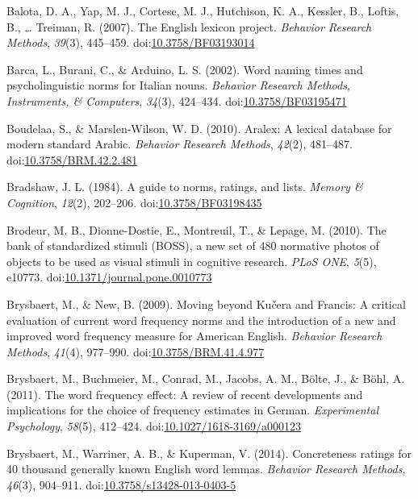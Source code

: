 \documentclass[english,man]{apa6}
\theoremstyle{definition}
\theoremstyle{definition}
\theoremstyle{definition}
\theoremstyle{remark}
\begin{document}
\hypertarget{ref-Balota2007}{}
Balota, D. A., Yap, M. J., Cortese, M. J., Hutchison, K. A., Kessler,
B., Loftis, B., \ldots{} Treiman, R. (2007). The English lexicon
project. \emph{Behavior Research Methods}, \emph{39}(3), 445--459.
doi:\href{https://doi.org/10.3758/BF03193014}{10.3758/BF03193014}

\hypertarget{ref-Barca2002}{}
Barca, L., Burani, C., \& Arduino, L. S. (2002). Word naming times and
psycholinguistic norms for Italian nouns. \emph{Behavior Research
Methods, Instruments, \& Computers}, \emph{34}(3), 424--434.
doi:\href{https://doi.org/10.3758/BF03195471}{10.3758/BF03195471}

\hypertarget{ref-Boudelaa2010}{}
Boudelaa, S., \& Marslen-Wilson, W. D. (2010). Aralex: A lexical
database for modern standard Arabic. \emph{Behavior Research Methods},
\emph{42}(2), 481--487.
doi:\href{https://doi.org/10.3758/BRM.42.2.481}{10.3758/BRM.42.2.481}

\hypertarget{ref-Bradshaw1984}{}
Bradshaw, J. L. (1984). A guide to norms, ratings, and lists.
\emph{Memory \& Cognition}, \emph{12}(2), 202--206.
doi:\href{https://doi.org/10.3758/BF03198435}{10.3758/BF03198435}

\hypertarget{ref-Brodeur2010}{}
Brodeur, M. B., Dionne-Dostie, E., Montreuil, T., \& Lepage, M. (2010).
The bank of standardized stimuli (BOSS), a new set of 480 normative
photos of objects to be used as visual stimuli in cognitive research.
\emph{PLoS ONE}, \emph{5}(5), e10773.
doi:\href{https://doi.org/10.1371/journal.pone.0010773}{10.1371/journal.pone.0010773}

\hypertarget{ref-Brysbaert2009}{}
Brysbaert, M., \& New, B. (2009). Moving beyond Kučera and Francis: A
critical evaluation of current word frequency norms and the introduction
of a new and improved word frequency measure for American English.
\emph{Behavior Research Methods}, \emph{41}(4), 977--990.
doi:\href{https://doi.org/10.3758/BRM.41.4.977}{10.3758/BRM.41.4.977}

\hypertarget{ref-Brysbaert2011}{}
Brysbaert, M., Buchmeier, M., Conrad, M., Jacobs, A. M., Bölte, J., \&
Böhl, A. (2011). The word frequency effect: A review of recent
developments and implications for the choice of frequency estimates in
German. \emph{Experimental Psychology}, \emph{58}(5), 412--424.
doi:\href{https://doi.org/10.1027/1618-3169/a000123}{10.1027/1618-3169/a000123}

\hypertarget{ref-Brysbaert2013}{}
Brysbaert, M., Warriner, A. B., \& Kuperman, V. (2014). Concreteness
ratings for 40 thousand generally known English word lemmas.
\emph{Behavior Research Methods}, \emph{46}(3), 904--911.
doi:\href{https://doi.org/10.3758/s13428-013-0403-5}{10.3758/s13428-013-0403-5}
\end{document}
